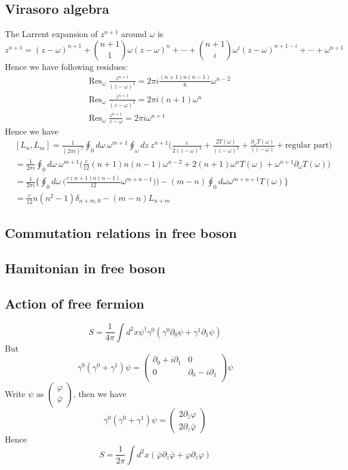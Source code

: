 \documentclass[11pt,a4paper]{article}
\theoremstyle{definition}
\DeclareMathOperator{\res}{Res}
\begin{document}
\subsection{Virasoro algebra}
The Larrent expansion of $z^{n+1}$ around $\omega$ is 
\[
z^{n+1}= (z- \omega)^{n+1} + \binom{n+1}{1} \omega (z-\omega)^n + \cdots + \binom{n+1}{i}\omega^i (z-\omega)^{n+1 -i} +\cdots + \omega^{n+1}
\]
 Hence we have following residues:
 \[
 \begin{aligned}
 &\res_{\omega} \frac{z^{n+1}}{(z-\omega)^4}= 2 \pi i \frac{(n+1)n(n-1)}{6} \omega^{n-2}\\ 
&\res_{\omega} \frac{z^{n+1}}{(z-\omega)^2}= 2 \pi i (n+1) \omega^n\\
&\res_{\omega} \frac{z^{n+1}}{z-\omega}= 2 \pi i \omega^{n+1}
 \end{aligned}
 \]
  Hence we have 
  \[
  \begin{aligned}
  &[L_n, L_m] = \frac{1}{(2 \pi i )^2} \oint_0 d \omega\ \omega^{m+1} \oint_\omega dz\ z^{n+1} \big(\frac{c}{2(z-\omega)^4} + \frac{2T(\omega)}{(z-\omega)^2} + \frac{\partial_\omega T(\omega)}{(z-\omega)} + \text{regular part}\big)\\
  &= \frac{1}{2 \pi i} \oint_0 d\omega\ \omega^{m+1} \big( \frac{c}{12}(n+1)n(n-1) \omega^{n-2} + 2(n+1) \omega ^n T(\omega) + \omega^{n+1} \partial_{\omega} T(\omega) \big)&\\
 &= \frac{1}{2 \pi i} \Big\{\oint_0 d\omega\ \Big( \frac{c(n+1) n(n-1)}{12} \omega^{m+n-1} )\Big) - (m-n) \oint_0 d\omega \omega^{m+n +1 } T(\omega) \Big\}&\\
 &= \frac{c}{12} n (n^2-1) \delta_{n+m,0} - (m-n) L_{n+m}
  \end{aligned}
  \]
 \subsection{Commutation relations in free boson}
 \subsection{Hamitonian in free boson}
 \subsection{Action of free fermion}
 \[
 S = \frac{1}{4\pi} \int d^2 x \psi^\dagger \gamma^0(\gamma^0 \partial_0 \psi + \gamma^1 \partial_1 \psi)
 \]
 But
 \[
 \gamma^0(\gamma^0 + \gamma^1) \psi = \begin{pmatrix}
 \partial_0 + i \partial_1& 0 \\
 0 & \partial_0 - i \partial_1\\
 \end{pmatrix} \psi
 \]
 Write $\psi$ as $\begin{pmatrix}
 \varphi\\ \bar{\varphi}
 \end{pmatrix}$, then we have $$ \gamma^0(\gamma^0 + \gamma^1) \psi = \begin{pmatrix}
 2\partial_{\bar{z}} \varphi\\ 2 \partial_{z} \bar{\varphi}
 \end{pmatrix}$$
 Hence 
 \[
	S = \frac{1}{2\pi} \int d^2 x (\bar{\varphi} \partial_{z} \bar{\varphi} +  \varphi \partial_{\bar{z}} \varphi)
 \]
\end{document}
